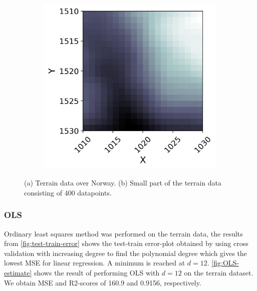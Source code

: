 \documentclass[../main.tex]{subfiles}
\begin{document}
\begin{figure}[H]
\begin{subfigure}[b]{0.35\textwidth}
    \caption{}
    \label{fig:terrain_Norway}
   \end{subfigure}
   \quad
   \begin{subfigure}[b]{0.55\textwidth}
    \centering
    \includegraphics[width=\textwidth]{../assets/part_of_terrain.png} 
    \caption{}
    \label{fig:terrain_Norway_patch}
   \end{subfigure}
   \caption{(a) Terrain data over Norway. (b) Small part of the terrain data consisting of 400 datapoints.}
\end{figure} 

\subsubsection{OLS}
Ordinary least squares method was performed on the terrain data, the results from  \autoref{fig:test-train-error} shows the test-train error-plot obtained by using cross validation with increasing degree to find the polynomial degree which gives the lowest MSE for linear regression. A minimum is reached at \ensuremath{d=12}. \autoref{fig:OLS-estimate} shows the result of performing OLS with $d=12$ on the terrain dataset. We obtain MSE and R2-scores of 160.9 and 0.9156, respectively. 
\end{document}
